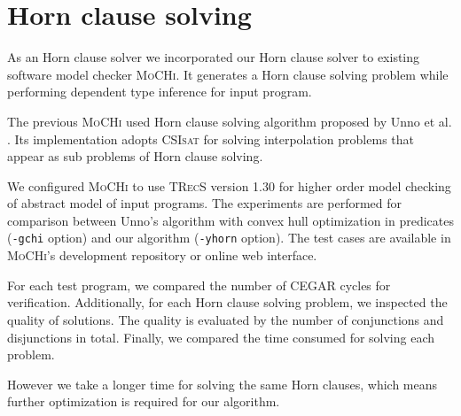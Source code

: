 \section{Horn clause solving}

As an Horn clause solver we incorporated our Horn clause solver to
existing software model checker \textsc{MoCHi}.  It generates a Horn
clause solving problem while performing dependent type inference for
input program.

The previous \textsc{MoCHi} used Horn clause solving algorithm
proposed by Unno et al. \cite{conf/ppdp/UnnoK09}.  Its implementation
adopts \textsc{CSIsat} for solving interpolation problems that appear
as sub problems of Horn clause solving.

We configured \textsc{MoCHi} to use \textsc{TRecS} version 1.30 for
higher order model checking of abstract model of input programs.  The
experiments are performed for comparison between Unno's algorithm with
convex hull optimization in predicates (\texttt{-gchi} option) and our
algorithm (\texttt{-yhorn} option).  The test cases are available in
\textsc{MoCHi}'s development repository or online web interface.

For each test program, we compared the number of CEGAR cycles for
verification.  Additionally, for each Horn clause solving problem, we
inspected the quality of solutions.  The quality is evaluated by the
number of conjunctions and disjunctions in total.  Finally, we
compared the time consumed for solving each problem.



However we take a longer time for solving the same Horn clauses, which
means further optimization is required for our algorithm.
